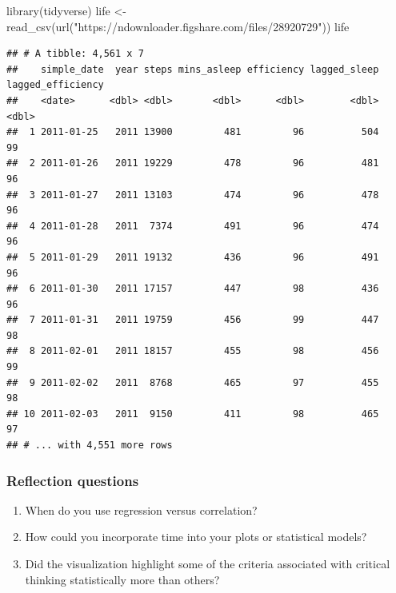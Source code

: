 \documentclass[
]{book}
\newenvironment{Shaded}{\begin{snugshade}}{\end{snugshade}}
\newcommand{\FunctionTok}[1]{\textcolor[rgb]{0.00,0.00,0.00}{#1}}
\newcommand{\NormalTok}[1]{#1}
\newcommand{\OtherTok}[1]{\textcolor[rgb]{0.56,0.35,0.01}{#1}}
\newcommand{\StringTok}[1]{\textcolor[rgb]{0.31,0.60,0.02}{#1}}
\providecommand{\tightlist}{%
  \setlength{\itemsep}{0pt}\setlength{\parskip}{0pt}}
\begin{document}
\begin{Shaded}
\begin{Highlighting}[]
\FunctionTok{library}\NormalTok{(tidyverse)}
\NormalTok{life }\OtherTok{\textless{}{-}} \FunctionTok{read\_csv}\NormalTok{(}\FunctionTok{url}\NormalTok{(}\StringTok{"https://ndownloader.figshare.com/files/28920729"}\NormalTok{))}
\NormalTok{life}
\end{Highlighting}
\end{Shaded}

\begin{verbatim}
## # A tibble: 4,561 x 7
##    simple_date  year steps mins_asleep efficiency lagged_sleep lagged_efficiency
##    <date>      <dbl> <dbl>       <dbl>      <dbl>        <dbl>             <dbl>
##  1 2011-01-25   2011 13900         481         96          504                99
##  2 2011-01-26   2011 19229         478         96          481                96
##  3 2011-01-27   2011 13103         474         96          478                96
##  4 2011-01-28   2011  7374         491         96          474                96
##  5 2011-01-29   2011 19132         436         96          491                96
##  6 2011-01-30   2011 17157         447         98          436                96
##  7 2011-01-31   2011 19759         456         99          447                98
##  8 2011-02-01   2011 18157         455         98          456                99
##  9 2011-02-02   2011  8768         465         97          455                98
## 10 2011-02-03   2011  9150         411         98          465                97
## # ... with 4,551 more rows
\end{verbatim}

\hypertarget{reflection-questions-2}{%
\subsubsection*{Reflection questions}\label{reflection-questions-2}}

\begin{enumerate}
\def\labelenumi{\arabic{enumi}.}
\tightlist
\item
  When do you use regression versus correlation?\\
\item
  How could you incorporate time into your plots or statistical models?\\
\item
  Did the visualization highlight some of the criteria associated with critical thinking statistically more than others?
\end{enumerate}
\end{document}
